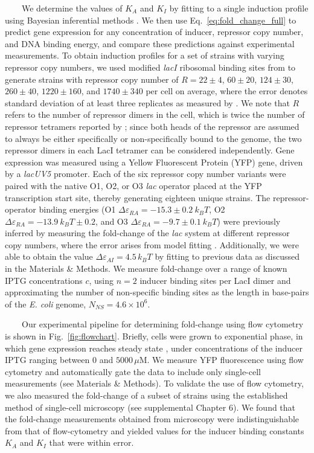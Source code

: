 \documentclass[12pt]{caltech_thesis}
\begin{document}
~~~~We determine the values of \(K_A\) and \(K_I\) by fitting to a
single induction profile using Bayesian inferential methods
\autocite{sivia2006}. We then use Eq.~\ref{eq:fold_change_full} to
predict gene expression for any concentration of inducer, repressor copy
number, and DNA binding energy, and compare these predictions against
experimental measurements. To obtain induction profiles for a set of
strains with varying repressor copy numbers, we used modified
\emph{lacI} ribosomal binding sites from \textcite{garcia2011} to
generate strains with repressor copy number of \(R = 22 \pm 4\),
\(60 \pm 20\), \(124 \pm 30\), \(260 \pm 40\), \(1220 \pm 160\), and
\(1740 \pm 340\) per cell on average, where the error denotes standard
deviation of at least three replicates as measured by
\textcite{garcia2011}. We note that \(R\) refers to the number of
repressor dimers in the cell, which is twice the number of repressor
tetramers reported by \textcite{garcia2011}; since both heads of the
repressor are assumed to always be either specifically or
non-specifically bound to the genome, the two repressor dimers in each
LacI tetramer can be considered independently. Gene expression was
measured using a Yellow Fluorescent Protein (YFP) gene, driven by a
\emph{lacUV5} promoter. Each of the six repressor copy number variants
were paired with the native O1, O2, or O3 \emph{lac} operator
\autocite{oehler1994} placed at the YFP transcription start site,
thereby generating eighteen unique strains. The repressor-operator
binding energies (O1 \(\Delta\varepsilon_{RA} = -15.3 \pm 0.2~k_BT\), O2
\(\Delta\varepsilon_{RA} = -13.9~k_BT \pm 0.2\), and O3
\(\Delta\varepsilon_{RA} = -9.7 \pm 0.1~k_BT\)) were previously inferred
by measuring the fold-change of the \emph{lac} system at different
repressor copy numbers, where the error arises from model fitting
\autocite{garcia2011}. Additionally, we were able to obtain the value
\(\Delta \varepsilon_{AI} = 4.5\, k_BT\) by fitting to previous data as
discussed in the Materials \& Methods. We measure fold-change over a
range of known IPTG concentrations \(c\), using \(n=2\) inducer binding
sites per LacI dimer and approximating the number of non-specific
binding sites as the length in base-pairs of the \emph{E. coli} genome,
\(N_{NS} = 4.6 \times 10^6\).

~~~~Our experimental pipeline for determining fold-change using flow
cytometry is shown in Fig.~\ref{fig:flowchart}. Briefly, cells were
grown to exponential phase, in which gene expression reaches steady
state \autocite{scott2010a}, under concentrations of the inducer IPTG
ranging between 0 and \(5000\, \mu\)M. We measure YFP fluorescence using
flow cytometry and automatically gate the data to include only
single-cell measurements (see Materials \& Methods). To validate the use
of flow cytometry, we also measured the fold-change of a subset of
strains using the established method of single-cell microscopy (see
supplemental Chapter 6). We found that the fold-change measurements
obtained from microscopy were indistinguishable from that of
flow-cytometry and yielded values for the inducer binding constants
\(K_A\) and \(K_I\) that were within error.
\end{document}
